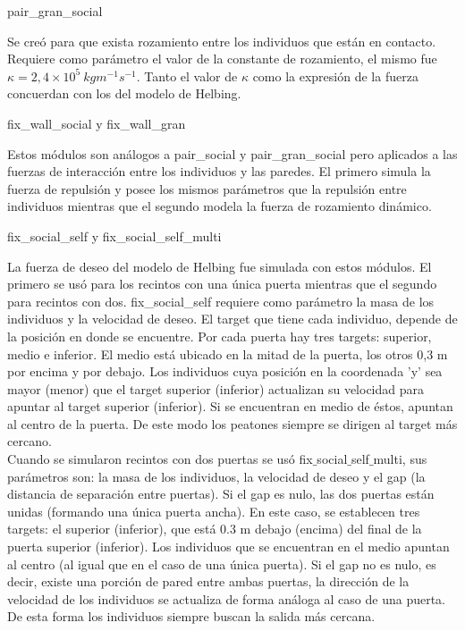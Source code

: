 {\Large pair\_gran\_social}

Se creó para que exista rozamiento entre los individuos que están en contacto. Requiere como parámetro el valor de la constante de rozamiento, el mismo fue $\kappa =2,4 \times 10^5~kgm^{-1}s^{-1}$. Tanto el valor de $\kappa$ como la expresión de la fuerza concuerdan con los del modelo de Helbing.

{\Large fix\_wall\_social y fix\_wall\_gran}

Estos módulos son análogos a pair\_social y pair\_gran\_social pero aplicados a las fuerzas de interacción entre los individuos y las paredes. El primero simula la fuerza de repulsión y posee los mismos parámetros que la repulsión entre individuos mientras que el segundo modela la fuerza de rozamiento dinámico. 

{\Large fix\_social\_self y fix\_social\_self\_multi}

La fuerza de deseo del modelo de Helbing fue simulada con estos módulos. El primero se usó para los recintos con una única puerta mientras que el segundo para recintos con dos. 
fix\_social\_self requiere como parámetro la masa de los individuos y la velocidad de deseo. El target que tiene cada individuo, depende de la posición en donde se encuentre. Por cada puerta hay tres targets: superior, medio e inferior. El medio está ubicado en la mitad de la puerta, los otros 0,3 m por encima y por debajo.  Los individuos cuya posición en la coordenada 'y' sea mayor (menor) que el target superior (inferior) actualizan su velocidad para apuntar al target superior (inferior). Si se encuentran en medio de éstos, apuntan al centro de la puerta. De este modo los peatones siempre se dirigen al target más cercano.\\  
Cuando se simularon recintos con dos puertas se usó fix$\_$social$\_$self$\_$multi, sus parámetros son: la masa de los individuos, la velocidad de deseo y el gap (la distancia de separación entre puertas). Si el gap es nulo, las dos puertas están unidas (formando una única puerta ancha). En este caso, se establecen tres targets: el superior (inferior), que está 0.3 m debajo (encima) del final de la puerta superior (inferior). Los individuos que se encuentran en el medio apuntan al centro (al igual que en el caso de una única puerta).
Si el gap no es nulo, es decir, existe una porción de pared entre ambas puertas, la dirección de la velocidad de los individuos se actualiza de forma análoga al caso de una puerta. De esta forma los individuos siempre buscan la salida más cercana. 


